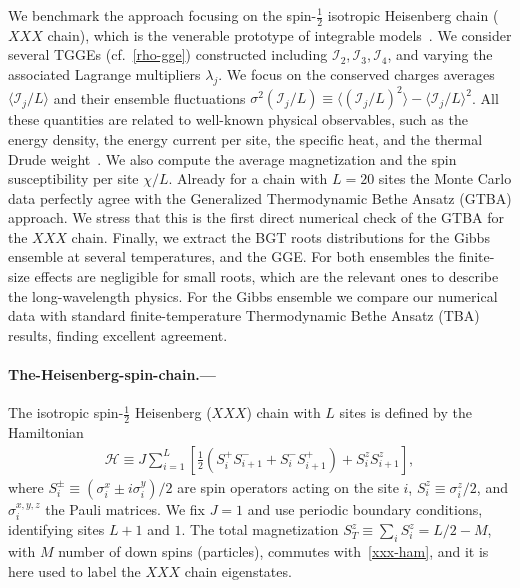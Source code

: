 \documentclass[twocolumn,superscriptaddress,prb,10pt]{revtex4-1}
\begin{document}
We benchmark the approach focusing on the spin-$\frac{1}{2}$ isotropic 
Heisenberg chain ($XXX$ chain), which is the venerable prototype of integrable 
models~\cite{bethe-1931}. We consider several TGGEs 
(cf.~\eqref{rho-gge}) constructed including ${\mathcal I}_2,{\mathcal I}_3,
{\mathcal I}_4$, and varying the associated Lagrange multipliers $\lambda_j$. 
We focus on the conserved charges averages $\langle{\mathcal I}_j/L\rangle$  
and their ensemble fluctuations $\sigma^2({\mathcal I}_j/L)\equiv\langle({\mathcal I}_j/L)^2
\rangle-\langle{\mathcal I}_j/L\rangle^2$. All these 
quantities are related to well-known physical observables, such as the energy density, 
the energy current per site, the specific heat, and the thermal Drude weight~\cite{klumper-2002}. 
We also compute the average magnetization and the spin 
susceptibility per site $\chi/L$. Already for a chain with $L=20$ sites the Monte Carlo 
data perfectly agree with the Generalized Thermodynamic Bethe Ansatz (GTBA) approach. We stress that 
this is the first direct numerical check of the GTBA for the $XXX$ chain. Finally, we extract 
the BGT roots distributions for the Gibbs ensemble at several temperatures, and the GGE. 
For both ensembles the finite-size effects are negligible for small roots, which are the 
relevant ones to describe the long-wavelength physics. For the Gibbs ensemble we compare 
our numerical data with standard finite-temperature Thermodynamic Bethe Ansatz (TBA) results, 
finding excellent agreement. 


\paragraph*{The-Heisenberg-spin-chain.---}

The isotropic spin-$\frac{1}{2}$ Heisenberg ($XXX$) chain with $L$ sites is defined by 
the Hamiltonian 
%
\begin{align}
\label{xxx-ham}
{\mathcal H}\equiv J\sum\limits_{i=1}^L\left[\frac{1}{2}(S_i^+S^-_{i+1} 
+S_i^{-}S_{i+1}^+)+S_i^zS_{i+1}^z\right],  
\end{align}
%
where $S^{\pm}_i\equiv (\sigma_i^x\pm i\sigma_i^y)/2$ are spin operators acting on the 
site $i$, $S_i^z\equiv\sigma_i^z/2$, and $\sigma^{x,y,z}_i$ the Pauli matrices. We fix 
$J=1$ and use periodic boundary conditions, identifying sites $L+1$ and $1$. The total 
magnetization $S_{T}^z\equiv\sum_iS_i^z=L/2-M$, with $M$ number of down spins (particles), 
commutes with~\eqref{xxx-ham}, and it is here used to label the $XXX$ chain eigenstates. 
\end{document}

